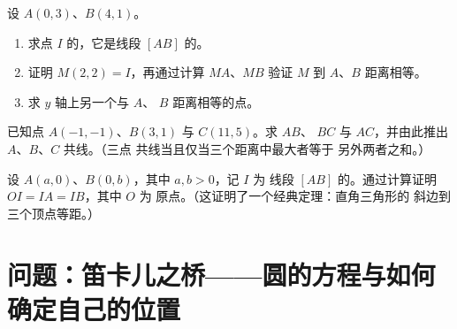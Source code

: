 \begin{exercise}[$\star\star$]\label{exo:g10:coordgeom:8}
设 $A(0, 3)$、$B(4, 1)$。
\begin{enumerate}
  \item 求点 $I$ 的，它是线段 $[AB]$ 的。
  \item 证明 $M(2, 2) = I$，再通过计算 $MA$、$MB$
        验证 $M$ 到 $A$、$B$ 距离相等。
  \item 求 $y$ 轴上另一个与 $A$、
        $B$ 距离相等的点。
\end{enumerate}
\end{exercise}

\begin{exercise}[$\star\star$]\label{exo:g10:coordgeom:9}
已知点 $A(-1, -1)$、$B(3, 1)$ 与 $C(11, 5)$。求 $AB$、
$BC$ 与 $AC$，并由此推出 $A$、$B$、$C$ 共线。（三点
共线当且仅当三个距离中最大者等于
另外两者之和。）
\end{exercise}

\begin{exercise}[$\star\star\star$]\label{exo:g10:coordgeom:10}
设 $A(a, 0)$、$B(0, b)$，其中 $a, b > 0$，记 $I$ 为
线段 $[AB]$ 的。通过计算证明 $OI = IA = IB$，其中 $O$ 为
原点。（这证明了一个经典定理：直角三角形的
斜边到三个顶点等距。）
\end{exercise}

\section{问题：笛卡儿之桥——圆的方程与如何
确定自己的位置}

